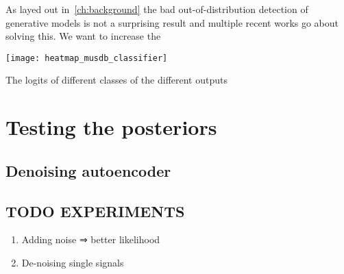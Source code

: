 As layed out in~\ref{ch:background} the bad out-of-distribution detection of generative models is not a surprising result and multiple recent works go about solving this. We want to increase the

\begin{marginfigure}
    \texttt{[image: heatmap\_musdb\_classifier]}
    \caption{The logits of different classes of the different outputs}%
    \label{fig:heatmap_musdb_classifier}
\end{marginfigure}

\section{Testing the posteriors}
\subsection{Denoising autoencoder}

\subsection{TODO EXPERIMENTS}
\begin{enumerate}
    \item Adding noise ⇒ better likelihood
    \item De-noising single signals
\end{enumerate}
